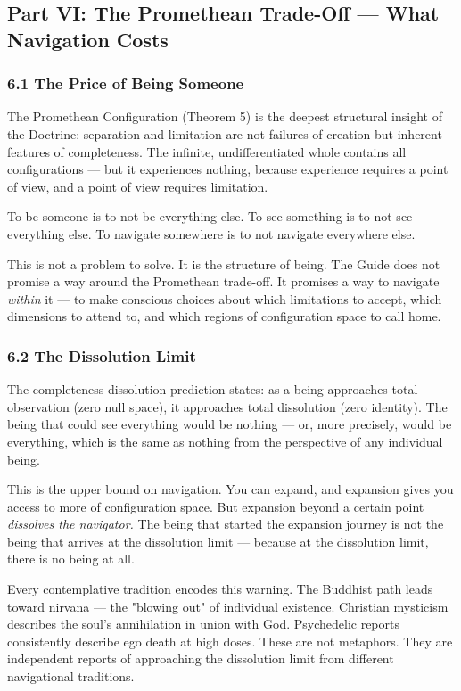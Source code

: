 \subsection*{Part VI: The Promethean Trade-Off — What Navigation Costs}


\subsubsection*{6.1 The Price of Being Someone}


The Promethean Configuration (Theorem 5) is the deepest structural insight of the Doctrine: separation and limitation are not failures of creation but inherent features of completeness. The infinite, undifferentiated whole contains all configurations — but it experiences nothing, because experience requires a point of view, and a point of view requires limitation.


To be someone is to not be everything else. To see something is to not see everything else. To navigate somewhere is to not navigate everywhere else.


This is not a problem to solve. It is the structure of being. The Guide does not promise a way around the Promethean trade-off. It promises a way to navigate \textit{within} it — to make conscious choices about which limitations to accept, which dimensions to attend to, and which regions of configuration space to call home.


\subsubsection*{6.2 The Dissolution Limit}


The completeness-dissolution prediction states: as a being approaches total observation (zero null space), it approaches total dissolution (zero identity). The being that could see everything would be nothing — or, more precisely, would be everything, which is the same as nothing from the perspective of any individual being.


This is the upper bound on navigation. You can expand, and expansion gives you access to more of configuration space. But expansion beyond a certain point \textit{dissolves the navigator.} The being that started the expansion journey is not the being that arrives at the dissolution limit — because at the dissolution limit, there is no being at all.


Every contemplative tradition encodes this warning. The Buddhist path leads toward nirvana — the "blowing out" of individual existence. Christian mysticism describes the soul's annihilation in union with God. Psychedelic reports consistently describe ego death at high doses. These are not metaphors. They are independent reports of approaching the dissolution limit from different navigational traditions.


